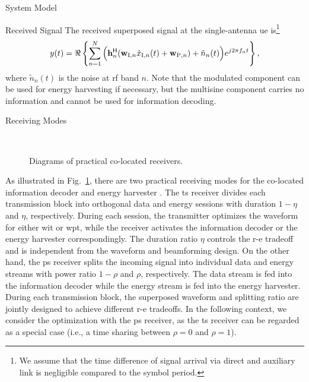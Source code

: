 \begin{section}{System Model}
	\begin{subsection}{Received Signal}
		The received superposed signal at the single-antenna \gls{ue} is\footnote{We assume that the time difference of signal arrival via direct and auxiliary link is negligible compared to the symbol period.}
		\begin{equation}
			y(t) = \Re\left\{\sum_{n=1}^N{\Bigl(\mathbf{h}_{n}^\mathsf{H}}{(\mathbf{w}_{\mathrm{I},n}\tilde{x}_{\mathrm{I},n}(t)+\mathbf{w}_{\mathrm{P},n})+\tilde{n}_n(t)\Bigr)}{e^{j2{\pi}{f_n}{t}}}\right\},
		\end{equation}
		where $\tilde{n}_n(t)$ is the noise at \gls{rf} band $n$. Note that the modulated component can be used for energy harvesting if necessary, but the multisine component carries no information and cannot be used for information decoding.
	\end{subsection}


	\begin{subsection}{Receiving Modes}
		\begin{figure}[!t]
			\centering
			\\
			\caption{Diagrams of practical co-located receivers.}
			\label{fi:receiver}
		\end{figure}

		As illustrated in Fig.~\ref{fi:receiver}, there are two practical receiving modes for the co-located information decoder and energy harvester \cite{Zhou2013}. The \gls{ts} receiver divides each transmission block into orthogonal data and energy sessions with duration $1-\eta$ and $\eta$, respectively. During each session, the transmitter optimizes the waveform for either \gls{wit} or \gls{wpt}, while the receiver activates the information decoder or the energy harvester correspondingly. The duration ratio $\eta$ controls the \gls{r-e} tradeoff and is independent from the waveform and beamforming design. On the other hand, the \gls{ps} receiver splits the incoming signal into individual data and energy streams with power ratio $1-\rho$ and $\rho$, respectively. The data stream is fed into the information decoder while the energy stream is fed into the energy harvester. During each transmission block, the superposed waveform and splitting ratio are jointly designed to achieve different \gls{r-e} tradeoffs. In the following context, we consider the optimization with the \gls{ps} receiver, as the \gls{ts} receiver can be regarded as a special case (i.e., a time sharing between $\rho=0$ and $\rho=1$).
	\end{subsection}



\end{section}

